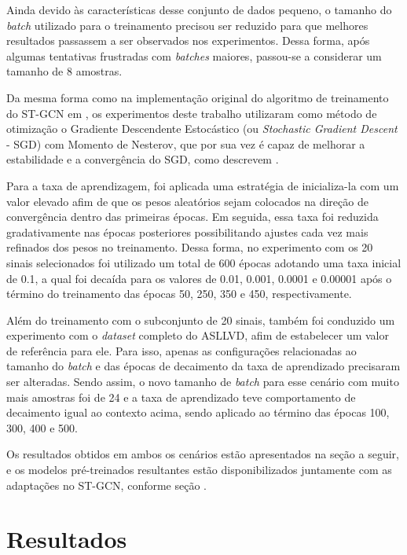 Ainda devido às características desse conjunto de dados pequeno, o tamanho do \textit{batch} utilizado para o treinamento precisou ser reduzido para que melhores resultados passassem a ser observados nos experimentos. Dessa forma, após algumas tentativas frustradas com \textit{batches} maiores, passou-se a considerar um tamanho de 8 amostras.

Da mesma forma como na implementação original do algoritmo de treinamento do ST-GCN em \cite{st-gcn-2018}, os experimentos deste trabalho utilizaram como método de otimização o Gradiente Descendente Estocástico (ou \textit{Stochastic Gradient Descent} - SGD) com Momento de Nesterov, que por sua vez é capaz de melhorar a estabilidade e a convergência do SGD, como descrevem \cite{stanford-2018, bengio-2013, sutskever-2013}.

Para a taxa de aprendizagem, foi aplicada uma estratégia de inicializa-la com um valor elevado afim de que os pesos aleatórios sejam colocados na direção de convergência dentro das primeiras épocas. Em seguida, essa taxa foi reduzida gradativamente nas épocas posteriores possibilitando ajustes cada vez mais refinados dos pesos no treinamento. Dessa forma, no experimento com os 20 sinais selecionados foi utilizado um total de 600 épocas adotando uma taxa inicial de 0.1, a qual foi decaída para os valores de 0.01, 0.001, 0.0001 e 0.00001 após o término do treinamento das épocas 50, 250, 350 e 450, respectivamente.


Além do treinamento com o subconjunto de 20 sinais, também foi conduzido um experimento com o \textit{dataset} completo do ASLLVD, afim de estabelecer um valor de referência para ele. Para isso, apenas as configurações relacionadas ao tamanho do \textit{batch} e das épocas de decaimento da taxa de aprendizado precisaram ser alteradas. Sendo assim, o novo tamanho de \textit{batch} para esse cenário com muito mais amostras foi de 24 e a taxa de aprendizado teve comportamento de decaimento igual ao contexto acima, sendo aplicado ao término das épocas 100, 300, 400 e 500.

Os resultados obtidos em ambos os cenários estão apresentados na seção a seguir, e os modelos pré-treinados resultantes estão disponibilizados juntamente com as adaptações no ST-GCN, conforme seção .


\section{Resultados} %
\label{sec:resultados}

